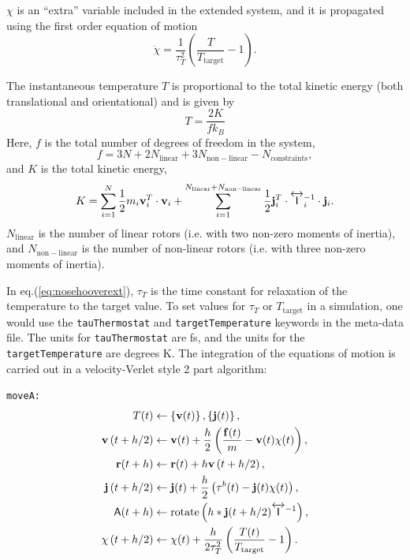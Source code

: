 \documentclass[]{book}
\begin{document}
$\chi$ is an ``extra'' variable included in the extended system, and
it is propagated using the first order equation of motion
\begin{equation}
\dot{\chi} = \frac{1}{\tau_{T}^2} \left( \frac{T}{T_{\mathrm{target}}} - 1 \right).
\label{eq:nosehooverext}
\end{equation}

The instantaneous temperature $T$ is proportional to the total kinetic
energy (both translational and orientational) and is given by
\begin{equation}
T = \frac{2 K}{f k_B}
\end{equation}
Here, $f$ is the total number of degrees of freedom in the system,
\begin{equation}
f = 3 N + 2 N_{\mathrm{linear}} + 3 N_{\mathrm{non-linear}} - N_{\mathrm{constraints}},
\end{equation}
and $K$ is the total kinetic energy,
\begin{equation}
K = \sum_{i=1}^{N} \frac{1}{2} m_i {\bf v}_i^T \cdot {\bf v}_i +
\sum_{i=1}^{N_{\mathrm{linear}}+N_{\mathrm{non-linear}}}  \frac{1}{2} {\bf j}_i^T \cdot
\overleftrightarrow{\mathsf{I}}_i^{-1} \cdot {\bf j}_i.
\end{equation}
$N_{\mathrm{linear}}$ is the number of linear rotors (i.e. with two
non-zero moments of inertia), and $N_{\mathrm{non-linear}}$ is the
number of non-linear rotors (i.e. with three non-zero moments of
inertia).  

In eq.(\ref{eq:nosehooverext}), $\tau_T$ is the time constant for
relaxation of the temperature to the target value.  To set values for
$\tau_T$ or $T_{\mathrm{target}}$ in a simulation, one would use the
{\tt tauThermostat} and {\tt targetTemperature} keywords in the
meta-data file.  The units for {\tt tauThermostat} are fs, and the
units for the {\tt targetTemperature} are degrees K.   The integration
of the equations of motion is carried out in a velocity-Verlet style 2
part algorithm:

{\tt moveA:}
\begin{align*}
T(t) &\leftarrow \left\{{\bf v}(t)\right\}, \left\{{\bf j}(t)\right\} ,\\
%
{\bf v}\left(t + h / 2\right)  &\leftarrow {\bf v}(t) 
	+ \frac{h}{2} \left( \frac{{\bf f}(t)}{m} - {\bf v}(t)
	\chi(t)\right), \\
%
{\bf r}(t + h) &\leftarrow {\bf r}(t) 
	+ h {\bf v}\left(t + h / 2 \right) ,\\
%
{\bf j}\left(t + h / 2 \right)  &\leftarrow {\bf j}(t) 
	+ \frac{h}{2} \left( {\bf \tau}^b(t) - {\bf j}(t)
	\chi(t) \right) ,\\
%
\mathsf{A}(t + h) &\leftarrow \mathrm{rotate}
	\left(h * {\bf j}(t + h / 2) 
	\overleftrightarrow{\mathsf{I}}^{-1} \right) ,\\
%
\chi\left(t + h / 2 \right) &\leftarrow \chi(t) 
	+ \frac{h}{2 \tau_T^2} \left( \frac{T(t)}
	{T_{\mathrm{target}}} - 1 \right) .
\end{align*}
\end{document}
